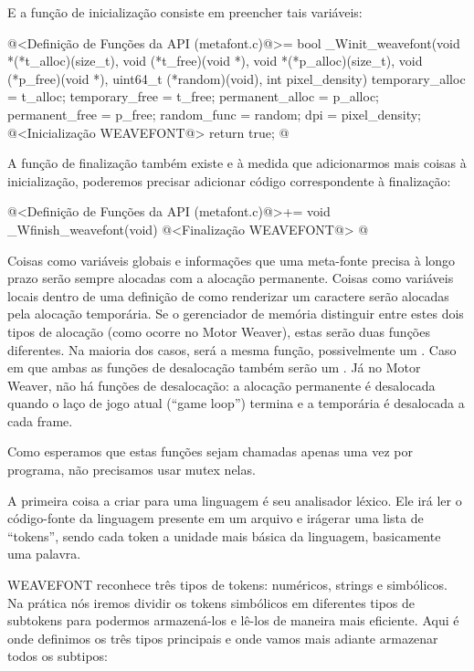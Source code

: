 E a função de inicialização consiste em preencher tais variáveis:

\iniciocodigo
@<Definição de Funções da API (metafont.c)@>=
bool _Winit_weavefont(void *(*t_alloc)(size_t),
                     void (*t_free)(void *),
                     void *(*p_alloc)(size_t),
                     void (*p_free)(void *),
                     uint64_t (*random)(void), int pixel_density){
  temporary_alloc = t_alloc;
  temporary_free = t_free;
  permanent_alloc = p_alloc;
  permanent_free = p_free;
  random_func = random;
  dpi = pixel_density;
  @<Inicialização WEAVEFONT@>
  return true;
}
@
\fimcodigo

A função de finalização também existe e à medida que adicionarmos mais
coisas à inicialização, poderemos precisar adicionar código
correspondente à finalização:

\iniciocodigo
@<Definição de Funções da API (metafont.c)@>+=
void _Wfinish_weavefont(void){
  @<Finalização WEAVEFONT@>
}
@
\fimcodigo

Coisas como variáveis globais e informações que uma meta-fonte precisa
à longo prazo serão sempre alocadas com a alocação permanente. Coisas
como variáveis locais dentro de uma definição de como renderizar um
caractere serão alocadas pela alocação temporária. Se o gerenciador de
memória distinguir entre estes dois tipos de alocação (como ocorre no
Motor Weaver), estas serão duas funções diferentes. Na maioria dos
casos, será a mesma função, possivelmente um . Caso
em que ambas as funções de desalocação também serão
um . Já no Motor Weaver, não há funções de
desalocação: a alocação permanente é desalocada quando o laço de jogo
atual (``game loop'') termina e a temporária é desalocada a cada frame.

Como esperamos que estas funções sejam chamadas apenas uma vez por
programa, não precisamos usar mutex nelas.



A primeira coisa a criar para uma linguagem é seu analisador
léxico. Ele irá ler o código-fonte da linguagem presente em um arquivo
e irágerar uma lista de ``tokens'', sendo cada token a unidade mais
básica da linguagem, basicamente uma palavra.

WEAVEFONT reconhece três tipos de tokens: numéricos, strings e
simbólicos. Na prática nós iremos dividir os tokens simbólicos em
diferentes tipos de subtokens para podermos armazená-los e lê-los de
maneira mais eficiente. Aqui é onde definimos os três tipos
principais e onde vamos mais adiante armazenar todos os subtipos:

